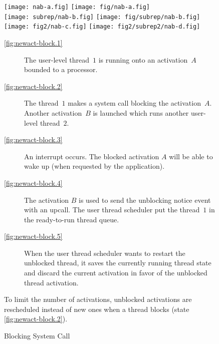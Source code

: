 \documentclass[10pt,a4paper]{article}
\begin{document}
\begin{figure}[htb]
  \centering
  \label{fig:newact-block.1}
    \texttt{[image: nab-a.fig]}
    \label{fig:newact-block.2}
    \texttt{[image: fig/nab-a.fig]}
  \\
  \label{fig:newact-block.3}
    \texttt{[image: subrep/nab-b.fig]}
    \label{fig:newact-block.4}
    \texttt{[image: fig/subrep/nab-b.fig]}
    \label{fig:newact-block.5}
    \texttt{[image: fig2/nab-c.fig]}
    \label{fig:newact-block.6}
    \texttt{[image: fig2/subrep2/nab-d.fig]}
  \begin{boxedminipage}{\linewidth}
    \small
    \begin{description}
    \item[\ref{fig:newact-block.1}] The user-level thread~$1$ is running onto
      an activation~$A$ bounded to a processor.
    \item[\ref{fig:newact-block.2}] The thread~$1$ makes a system call
      blocking the activation~$A$. Another activation~$B$ is launched
      which runs another user-level thread~$2$.
    \item[\ref{fig:newact-block.3}] An interrupt occurs. The blocked
      activation $A$ will be able to wake up (when requested by the
      application).
    \item[\ref{fig:newact-block.4}] The activation $B$ is used to send
      the unblocking notice event with an upcall. The user thread
      scheduler put the thread~$1$ in the ready-to-run thread queue.
    \item[\ref{fig:newact-block.5}] When the user thread scheduler
      wants to restart the unblocked thread, it saves the currently
      running thread state and discard the current activation in
      favor of the unblocked thread activation.
    \end{description}
    To limit the number of activations, unblocked activations are
    rescheduled instead of new ones when a thread blocks (state
    \ref{fig:newact-block.2}).
  \end{boxedminipage}
  \caption{Blocking System Call}
  \label{fig:newact-block}
\end{figure}
\end{document}
